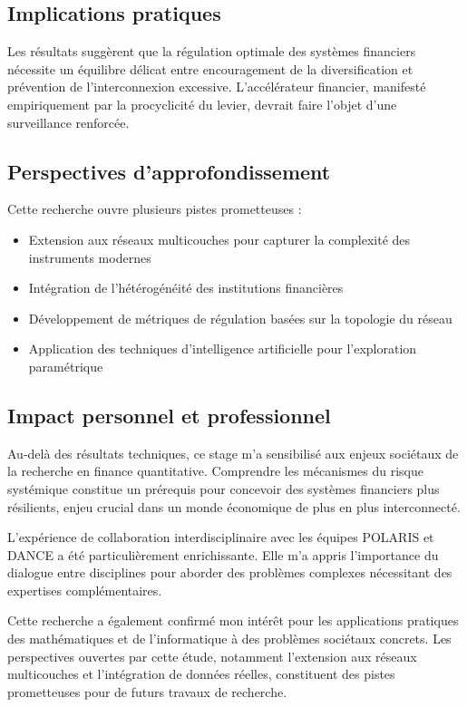 \documentclass[12pt,a4paper,twoside]{article}
\begin{document}
\subsection{Implications pratiques}

Les résultats suggèrent que la régulation optimale des systèmes financiers nécessite un équilibre délicat entre encouragement de la diversification et prévention de l'interconnexion excessive. L'accélérateur financier, manifesté empiriquement par la procyclicité du levier, devrait faire l'objet d'une surveillance renforcée.

\subsection{Perspectives d'approfondissement}

Cette recherche ouvre plusieurs pistes prometteuses :
\begin{itemize}
\item Extension aux réseaux multicouches pour capturer la complexité des instruments modernes
\item Intégration de l'hétérogénéité des institutions financières
\item Développement de métriques de régulation basées sur la topologie du réseau
\item Application des techniques d'intelligence artificielle pour l'exploration paramétrique
\end{itemize}

\subsection{Impact personnel et professionnel}

Au-delà des résultats techniques, ce stage m'a sensibilisé aux enjeux sociétaux de la recherche en finance quantitative. Comprendre les mécanismes du risque systémique constitue un prérequis pour concevoir des systèmes financiers plus résilients, enjeu crucial dans un monde économique de plus en plus interconnecté.

L'expérience de collaboration interdisciplinaire avec les équipes POLARIS et DANCE a été particulièrement enrichissante. Elle m'a appris l'importance du dialogue entre disciplines pour aborder des problèmes complexes nécessitant des expertises complémentaires.

Cette recherche a également confirmé mon intérêt pour les applications pratiques des mathématiques et de l'informatique à des problèmes sociétaux concrets. Les perspectives ouvertes par cette étude, notamment l'extension aux réseaux multicouches et l'intégration de données réelles, constituent des pistes prometteuses pour de futurs travaux de recherche.
\end{document}
